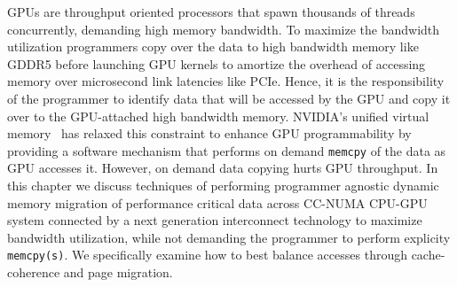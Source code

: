 %
GPUs are throughput oriented processors that spawn thousands of threads
concurrently, demanding high memory bandwidth. To maximize the bandwidth
utilization programmers copy over the data to high bandwidth memory like GDDR5
before launching GPU kernels to amortize the overhead of accessing memory over
microsecond link latencies like PCIe. Hence, it is the responsibility of the
programmer to identify data that will be accessed by the GPU and copy it over to
the GPU-attached high bandwidth memory. NVIDIA's unified virtual
memory~\cite{UVM} has relaxed this constraint to enhance GPU programmability by
providing a software mechanism that performs on demand {\tt memcpy} of the data
as GPU accesses it. However, on demand data copying hurts GPU throughput. In
this chapter we discuss techniques of performing programmer agnostic dynamic
memory migration of performance critical data across CC-NUMA CPU-GPU system
connected by a next generation interconnect technology to maximize bandwidth
utilization, while not demanding the programmer to perform explicity {\tt
memcpy(s)}.  We specifically examine how to best balance accesses through
cache-coherence and page migration.



